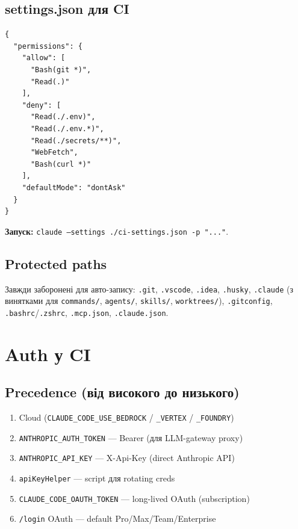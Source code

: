 \documentclass[11pt,a4paper]{article}
\begin{document}
\subsection{settings.json для CI}

\begin{lstlisting}
{
  "permissions": {
    "allow": [
      "Bash(git *)",
      "Read(.)"
    ],
    "deny": [
      "Read(./.env)",
      "Read(./.env.*)",
      "Read(./secrets/**)",
      "WebFetch",
      "Bash(curl *)"
    ],
    "defaultMode": "dontAsk"
  }
}
\end{lstlisting}

\textbf{Запуск:} \texttt{claude --settings ./ci-settings.json -p "..."}.

\subsection{Protected paths}

Завжди заборонені для авто-запису: \texttt{.git}, \texttt{.vscode}, \texttt{.idea}, \texttt{.husky}, \texttt{.claude} (з винятками для \texttt{commands/}, \texttt{agents/}, \texttt{skills/}, \texttt{worktrees/}), \texttt{.gitconfig}, \texttt{.bashrc}/\texttt{.zshrc}, \texttt{.mcp.json}, \texttt{.claude.json}.

\section{Auth у CI}

\subsection{Precedence (від високого до низького)}

\begin{enumerate}
\item Cloud (\texttt{CLAUDE\_CODE\_USE\_BEDROCK} / \texttt{\_VERTEX} / \texttt{\_FOUNDRY})
\item \texttt{ANTHROPIC\_AUTH\_TOKEN} --- Bearer (для LLM-gateway proxy)
\item \texttt{ANTHROPIC\_API\_KEY} --- X-Api-Key (direct Anthropic API)
\item \texttt{apiKeyHelper} --- script для rotating creds
\item \texttt{CLAUDE\_CODE\_OAUTH\_TOKEN} --- long-lived OAuth (subscription)
\item \texttt{/login} OAuth --- default Pro/Max/Team/Enterprise
\end{enumerate}
\end{document}
